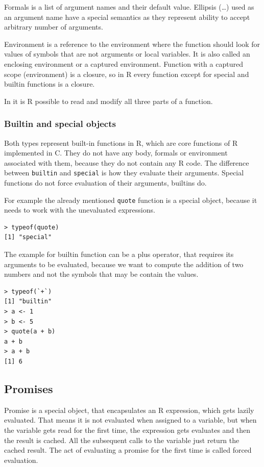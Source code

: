 \documentclass[thesis=B,english]{FITthesis}[2012/10/20]
\begin{document}
Formals is a list of argument names and their default value. Ellipsis (\ldots) used as an argument name have a special semantics as they represent ability to accept arbitrary number of arguments. 

Environment is a reference to the environment where the function should look for values of symbols that are not arguments or local variables. It is also called an enclosing environment or a captured environment. Function with a captured scope (environment) is a closure, so in R every function except for special and builtin functions is a closure.

In it is R possible to read and modify all three parts of a function.

\subsubsection{Builtin and special objects}
Both types represent built-in functions in R, which are core functions of R implemented in C. They do not have any body, formals or environment associated with them, because they do not contain any R code. The difference between \verb|builtin| and \verb|special| is how they evaluate their arguments. Special functions do not force evaluation of their arguments, builtins do.

For example the already mentioned \verb|quote| function is a special object, because it needs to work with the unevaluated expressions. 

\begin{verbatim}
> typeof(quote)
[1] "special" 
\end{verbatim}

The example for builtin function can be a plus operator, that requires its arguments to be evaluated, because we want to compute the addition of two numbers and not the symbols that may be contain the values.

\begin{verbatim}
> typeof(`+`)
[1] "builtin" 
> a <- 1
> b <- 5
> quote(a + b)
a + b
> a + b
[1] 6 
\end{verbatim}

\subsection{Promises}
Promise is a special object, that encapsulates an R expression, which gets lazily evaluated. That means it is not evaluated when assigned to a variable, but when the variable gets read for the first time, the expression gets evaluates and then the result is cached. All the subsequent calls to the variable just return the cached result. The act of evaluating a promise for the first time is called forced evaluation. 
\end{document}
